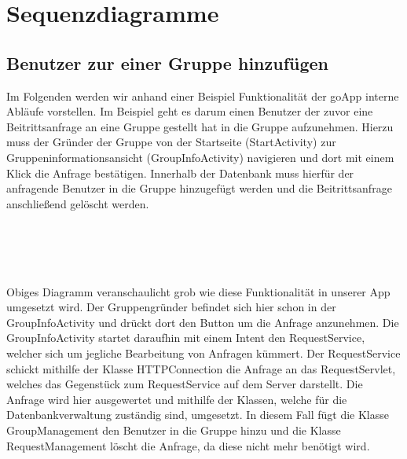\newpage
\section{Sequenzdiagramme}

\subsection{Benutzer zur einer Gruppe hinzufügen}
Im Folgenden werden wir anhand einer Beispiel Funktionalität der goApp interne Abläufe vorstellen.
Im Beispiel geht es darum einen Benutzer der zuvor eine Beitrittsanfrage an eine Gruppe gestellt hat in die Gruppe aufzunehmen.
Hierzu muss der Gründer der Gruppe von der Startseite (StartActivity) zur Gruppeninformationsansicht (GroupInfoActivity) navigieren und dort mit einem Klick die Anfrage bestätigen.
Innerhalb der Datenbank muss hierfür der anfragende Benutzer in die Gruppe hinzugefügt werden und die Beitrittsanfrage anschließend gelöscht werden.
\ \\
\ \\
\ \\
\begin {center}
\end {center}
\ \\
\ \\
Obiges Diagramm veranschaulicht grob wie diese Funktionalität in unserer App umgesetzt wird.
Der Gruppengründer befindet sich hier schon in der GroupInfoActivity und drückt dort den Button um die Anfrage anzunehmen.
Die GroupInfoActivity startet daraufhin mit einem Intent den RequestService, welcher sich um jegliche Bearbeitung von Anfragen kümmert.
Der RequestService schickt mithilfe der Klasse HTTPConnection die Anfrage an das RequestServlet, welches das Gegenstück zum RequestService auf dem Server darstellt.
Die Anfrage wird hier ausgewertet und mithilfe der Klassen, welche für die Datenbankverwaltung zuständig sind, umgesetzt. In diesem Fall fügt die Klasse GroupManagement den Benutzer in die Gruppe hinzu und die Klasse RequestManagement löscht die Anfrage, da diese nicht mehr benötigt wird.
